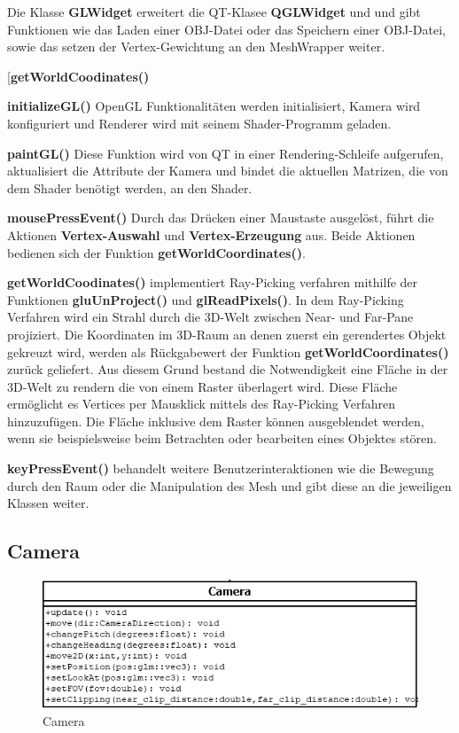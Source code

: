 	Die Klasse \textbf{GLWidget} erweitert die QT-Klasee \textbf{QGLWidget} und und gibt Funktionen wie das Laden einer OBJ-Datei oder das Speichern einer OBJ-Datei, sowie das setzen der Vertex-Gewichtung an den MeshWrapper weiter.\newline\newline

	\begin{labeling}[]{[\textbf{getWorldCoodinates()}}%
	\item[\textbf{initializeGL()}] OpenGL Funktionalitäten werden initialisiert, Kamera wird konfiguriert und Renderer wird mit seinem Shader-Programm geladen.
	\item[\textbf{paintGL()}] Diese Funktion wird von QT in einer Rendering-Schleife aufgerufen, aktualisiert die Attribute der Kamera und bindet  die aktuellen Matrizen, die von dem Shader benötigt werden, an den Shader.
	\item[\textbf{mousePressEvent()}] Durch das Drücken einer Maustaste ausgelöst, führt die Aktionen \textbf{Vertex-Auswahl} und \textbf{Vertex-Erzeugung} aus. Beide Aktionen bedienen sich der Funktion \textbf{getWorldCoordinates()}.
	\item[\textbf{getWorldCoodinates()}]  implementiert Ray-Picking verfahren mithilfe der Funktionen \textbf{gluUnProject()} und \textbf{glReadPixels()}. In dem Ray-Picking Verfahren wird ein Strahl durch die 3D-Welt zwischen Near- und Far-Pane projiziert. Die Koordinaten im 3D-Raum an denen zuerst ein gerendertes Objekt gekreuzt wird, werden als Rückgabewert der Funktion \textbf{getWorldCoordinates()} zurück geliefert. Aus diesem Grund bestand die Notwendigkeit eine Fläche in der 3D-Welt zu rendern die von einem Raster überlagert wird. Diese Fläche ermöglicht es Vertices per Mausklick mittels des Ray-Picking Verfahren hinzuzufügen. Die Fläche inklusive dem Raster können ausgeblendet werden, wenn sie beispielsweise beim Betrachten oder bearbeiten eines Objektes stören.
	\item[\textbf{keyPressEvent()}] behandelt weitere Benutzerinteraktionen wie die Bewegung durch den Raum oder die Manipulation des Mesh und gibt diese an die jeweiligen Klassen weiter.
	\end{labeling}

\subsection{Camera}
				
	\begin{figure}[H]
	\centering
	\includegraphics[width=0.7\linewidth]{camera.png}
	\caption{Camera}
	\label{fig3}
	\end{figure}

